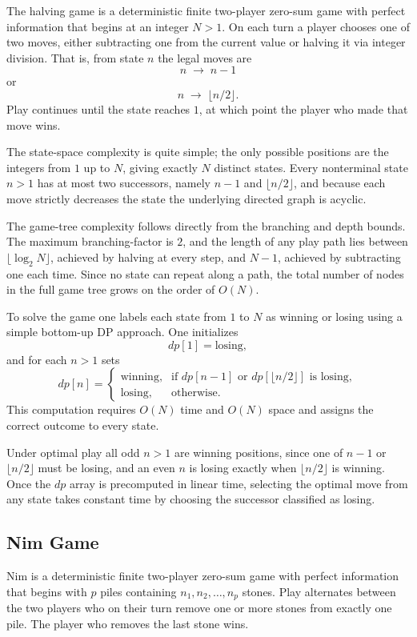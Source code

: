 \documentclass[12pt]{article}
\begin{document}
The halving game is a deterministic finite two-player zero-sum game with perfect information that begins at an integer \(N>1\). On each turn a player chooses one of two moves, either subtracting one from the current value or halving it via integer division. That is, from state \(n\) the legal moves are  
\[
n \;\to\; n-1
\]
or
\[
n \;\to\; \lfloor n/2\rfloor.
\]
Play continues until the state reaches \(1\), at which point the player who made that move wins.

The state-space complexity is quite simple; the only possible positions are the integers from \(1\) up to \(N\), giving exactly \(N\) distinct states. Every nonterminal state \(n>1\) has at most two successors, namely \(n-1\) and \(\lfloor n/2\rfloor\), and because each move strictly decreases the state the underlying directed graph is acyclic.

The game-tree complexity follows directly from the branching and depth bounds. The maximum \gls{branching-factor} is \(2\), and the length of any play path lies between 
\(\lfloor\log_2 N\rfloor\), achieved by halving at every step, and \(N-1\), achieved by subtracting one each time. Since no state can repeat along a path, the total number of nodes in the full game tree grows on the order of \(O(N)\).

To solve the game one labels each state from \(1\) to \(N\) as winning or losing using a simple bottom-up DP approach. One initializes  
\[
dp[1] = \text{losing},
\]
and for each \(n>1\) sets  
\[
dp[n] = 
\begin{cases}
\text{winning}, & \text{if }dp[n-1]\text{ or }dp[\lfloor n/2\rfloor]\text{ is losing},\\
\text{losing}, & \text{otherwise}.
\end{cases}
\]
This computation requires \(O(N)\) time and \(O(N)\) space and assigns the correct outcome to every state.

Under optimal play all odd \(n>1\) are winning positions, since one of \(n-1\) or \(\lfloor n/2\rfloor\) must be losing, and an even \(n\) is losing exactly when \(\lfloor n/2\rfloor\) is winning. Once the \(dp\) array is precomputed in linear time, selecting the optimal move from any state takes constant time by choosing the successor classified as losing.

\subsection{Nim Game}

Nim is a deterministic finite two-player zero-sum game with perfect information that begins with \(p\) piles containing \(n_1, n_2, \dots, n_p\) stones. Play alternates between the two players who on their turn remove one or more stones from exactly one pile. The player who removes the last stone wins.
\end{document}
